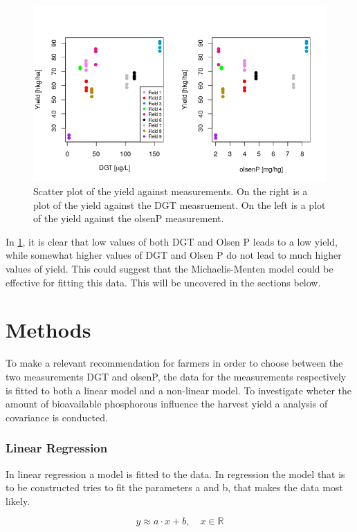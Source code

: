 \documentclass[11pt, fleqn, titlepage]{article}
\begin{document}
\begin{figure}[H]
	\centering
	\includegraphics[width=0.7\linewidth]{billeder/measurementz}
	\caption{Scatter plot of the yield against measurements. On the right is a plot of the yield against the DGT measruement. On the left is a plot of the yield against the olsenP measurement.}
	\label{fig:measurementz}
\end{figure}

In \ref{fig:measurementz}, it is clear that low values of both DGT and Olsen P leads to a low yield, while somewhat higher values of DGT and Olsen P do not lead to much higher values of yield. This could suggest that the Michaelis-Menten model could be effective for fitting this data. This will be uncovered in the sections below.

\section{Methods}
To make a relevant recommendation for farmers in order to choose between the two measurements DGT and olsenP, the data for the measurements respectively is fitted to both a linear model and a non-linear model. To investigate wheter the amount of bioavailable phosphorous influence the harvest yield a analysis of covariance is conducted.

\subsubsection*{Linear Regression}
In linear regression a model is fitted to the data. In regression the model that is to be constructed tries to fit the parameters a and b, that makes the data most likely.

\[ y \approx a \cdot x + b, \quad x \in \mathbb R  \]
\end{document}
